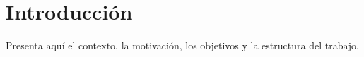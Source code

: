 \documentclass[main.tex]{subfiles}
\begin{document}
\chapter{Introducción}

Presenta aquí el contexto, la motivación, los objetivos y la estructura del trabajo.
\end{document}
